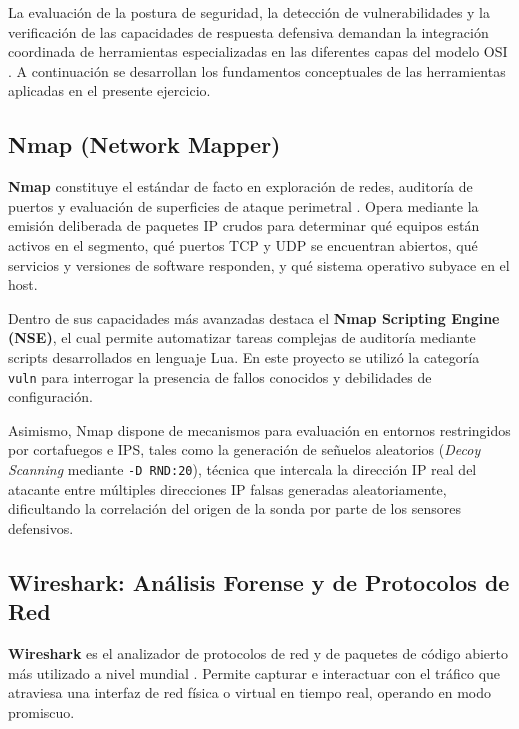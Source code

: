 La evaluación de la postura de seguridad, la detección de vulnerabilidades y la verificación de las capacidades de respuesta defensiva demandan la integración coordinada de herramientas especializadas en las diferentes capas del modelo OSI \citep{nist_sp800_115}. A continuación se desarrollan los fundamentos conceptuales de las herramientas aplicadas en el presente ejercicio.

\subsection{Nmap (Network Mapper)}

\textbf{Nmap} constituye el estándar de facto en exploración de redes, auditoría de puertos y evaluación de superficies de ataque perimetral \citep{lyon_nmap_2009}. Opera mediante la emisión deliberada de paquetes IP crudos para determinar qué equipos están activos en el segmento, qué puertos TCP y UDP se encuentran abiertos, qué servicios y versiones de software responden, y qué sistema operativo subyace en el host.

Dentro de sus capacidades más avanzadas destaca el \textbf{Nmap Scripting Engine (NSE)}, el cual permite automatizar tareas complejas de auditoría mediante scripts desarrollados en lenguaje Lua. En este proyecto se utilizó la categoría \texttt{vuln} para interrogar la presencia de fallos conocidos y debilidades de configuración.

Asimismo, Nmap dispone de mecanismos para evaluación en entornos restringidos por cortafuegos e IPS, tales como la generación de señuelos aleatorios (\textit{Decoy Scanning} mediante \texttt{-D RND:20}), técnica que intercala la dirección IP real del atacante entre múltiples direcciones IP falsas generadas aleatoriamente, dificultando la correlación del origen de la sonda por parte de los sensores defensivos.

\subsection{Wireshark: Análisis Forense y de Protocolos de Red}

\textbf{Wireshark} es el analizador de protocolos de red y de paquetes de código abierto más utilizado a nivel mundial \citep{sanders_practical_2020}. Permite capturar e interactuar con el tráfico que atraviesa una interfaz de red física o virtual en tiempo real, operando en modo promiscuo.

